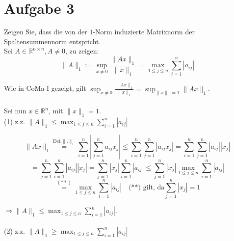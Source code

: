 \documentclass[11pt,a4paper,ngerman]{article}
\begin{document}


\section*{Aufgabe 3}
Zeigen Sie, dass die von der $1$-Norm induzierte Matrixnorm der Spaltensummennorm entspricht. \\

Sei $A \in \mathbb{R}^{n \times n}, A \neq 0$, zu zeigen:
$$ \|A \|_1 := \sup_{x \neq 0}{\frac{\|Ax\|_{1}}{\|x\|_{1}}}
                  =\max_{1 \leq j \leq n}{\sum_{i=1}^{n}{|a_{ij}|}} $$

Wie in CoMa I gezeigt, gilt
$\sup_{x \neq 0}{\frac{\|Ax\|_{1}}{\|x\|_{1}}} = \sup_{\|x\|_{1} = 1}{\|Ax\|_{1}}$. \\ \\
Sei nun $x \in \mathbb{R}^{n}$, mit $\|x\|_{1} = 1$.\\

(1) z.z. $\|A \|_1 \leq \max_{1 \leq j \leq n}{\sum_{i=1}^{n}{|a_{ij}|}}$ 

$$
\|Ax\|_{1} \stackrel{\text{Def.}\|.\|_{1}}{=}
     \sum_{i=1}^{n}{\left| \sum_{j=1}^{n}{a_{ij}x_j} \right|}
\leq \sum_{i=1}^{n}{\sum_{j=1}^{n}{\left|a_{ij}x_j\right|} }
=    \sum_{i=1}^{n}{\sum_{j=1}^{n}{|a_{ij}||x_j|} }
$$
$$
=    \sum_{j=1}^{n}{\sum_{i=1}^{n}{|a_{ij}||x_j|} }
=    \sum_{j=1}^{n}{|x_j| \sum_{i=1}^{n}{|a_{ij}|} }
\leq \sum_{j=1}^{n}{|x_j| \max_{1\leq j \leq n}{\sum_{i=1}^{n}{|a_{ij}|}} }
$$
$$
\stackrel{(**)}{=} \max_{1\leq j \leq n}{\sum_{i=1}^{n}{|a_{ij}|}} \quad \text{(**) gilt, da} \sum_{j=1}^{n}{|x_j|} = 1
$$

$\Rightarrow \|A\|_{1} \leq \max_{1 \leq j \leq n}{\sum_{i=1}^{n}{|a_{ij}|}}$. \\ \\

(2) z.z. $\|A \|_1 \geq \max_{1 \leq j \leq n}{\sum_{i=1}^{n}{|a_{ij}|}}$ 
\end{document}
